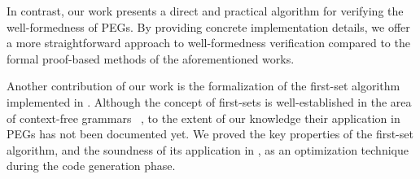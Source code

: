 In contrast, our work presents a direct and practical algorithm
for verifying the well-formedness of PEGs.
By providing concrete implementation details,
we offer a more straightforward approach
to well-formedness verification compared
to the formal proof-based methods of the aforementioned works.

Another contribution of our work
is the formalization of the first-set algorithm implemented in \lpeg{}.
Although the concept of first-sets is well-established
in the area of context-free grammars~%
\cite{chomsky_three_1956},
to the extent of our knowledge
their application in PEGs has not been documented yet.
We proved the key properties of the first-set algorithm,
and the soundness of its application in \lpeg{},
as an optimization technique
during the code generation phase.
